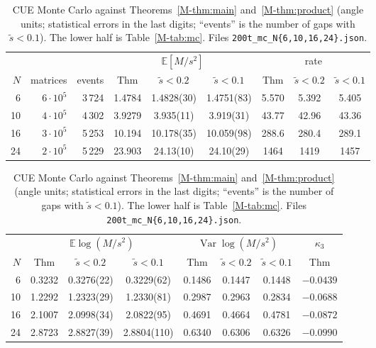 \documentclass[12pt]{amsart}
\theoremstyle{remark}
\newcommand{\E}{\mathbb{E}}
\newcommand{\1}{\mathbf{1}}
\DeclareMathOperator{\Var}{Var}
\begin{document}
\begin{table}[h]
\centering
\small
\begin{tabular}{rrrcccccc}
\toprule
& & & \multicolumn{3}{c}{$\E[M/s^2]$} & \multicolumn{3}{c}{rate}\\
\cmidrule(lr){4-6}\cmidrule(lr){7-9}
$N$ & matrices & events & Thm & $\tilde s<0.2$ & $\tilde s<0.1$
& Thm & $\tilde s<0.2$ & $\tilde s<0.1$\\
\midrule
6 & $6\cdot10^5$ & 3\,724 & 1.4784 & 1.4828(30) & 1.4751(83) & 5.570 & 5.392 & 5.405\\
10 & $4\cdot10^5$ & 4\,302 & 3.9279 & 3.935(11) & 3.919(31) & 43.77 & 42.96 & 43.36\\
16 & $3\cdot10^5$ & 5\,253 & 10.194 & 10.178(35) & 10.059(98) & 288.6 & 280.4 & 289.1\\
24 & $2\cdot10^5$ & 5\,229 & 23.903 & 24.13(10) & 24.10(29) & 1464 & 1419 & 1457\\
\bottomrule
\end{tabular}

\medskip
\begin{tabular}{rccccccc}
\toprule
& \multicolumn{3}{c}{$\E\log(M/s^2)$} & \multicolumn{3}{c}{$\Var\log(M/s^2)$} & $\kappa_3$\\
\cmidrule(lr){2-4}\cmidrule(lr){5-7}\cmidrule(lr){8-8}
$N$ & Thm & $\tilde s<0.2$ & $\tilde s<0.1$ & Thm & $\tilde s<0.2$ & $\tilde s<0.1$ & Thm\\
\midrule
6 & 0.3232 & 0.3276(22) & 0.3229(62) & 0.1486 & 0.1447 & 0.1448 & $-0.0439$\\
10 & 1.2292 & 1.2323(29) & 1.2330(81) & 0.2987 & 0.2963 & 0.2834 & $-0.0688$\\
16 & 2.1007 & 2.0998(34) & 2.0822(95) & 0.4691 & 0.4664 & 0.4781 & $-0.0872$\\
24 & 2.8723 & 2.8827(39) & 2.8804(110) & 0.6340 & 0.6306 & 0.6326 & $-0.0990$\\
\bottomrule
\end{tabular}
\caption{\label{tab:mcfull}CUE Monte Carlo against
Theorems~\ref{M-thm:main} and~\ref{M-thm:product} (angle units;
statistical errors in the last digits; ``events'' is the number of gaps
with $\tilde s<0.1$). The lower half is Table~\ref{M-tab:mc}. Files
\texttt{200t\_mc\_N\{6,10,16,24\}.json}.}
\end{table}
\end{document}
